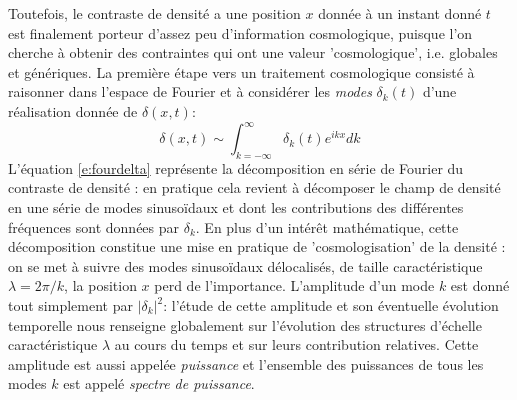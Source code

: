 Toutefois, le contraste de densité a une position $x$ donnée à un instant donné $t$ est finalement porteur d'assez peu d'information cosmologique, puisque l'on cherche à obtenir des contraintes qui ont une valeur 'cosmologique', i.e. globales et génériques. La première étape vers un traitement cosmologique consisté à raisonner dans l'espace de Fourier et à considérer les \textit{modes} $\delta_k(t)$ d'une réalisation donnée de $\delta(x,t)$:
\begin{equation}
\delta(x,t)\sim\int_{k=-\infty}^\infty \delta_k(t) e^{ikx} dk
\label{e:fourdelta}
\end{equation}
L'équation \ref{e:fourdelta} représente la décomposition en série de Fourier du contraste de densité : en pratique cela revient à décomposer le champ de densité en une série de modes sinusoïdaux et dont les contributions des différentes fréquences sont données par $\delta_k$. En plus d'un intérêt mathématique, cette décomposition constitue une mise en pratique de 'cosmologisation' de la densité : on se met à suivre des modes sinusoïdaux délocalisés, de taille caractéristique $\lambda=2\pi/k$, la position $x$ perd de l'importance. L'amplitude d'un mode $k$ est donné tout simplement par $|\delta_k|^2$: l'étude de cette amplitude et son éventuelle évolution temporelle nous renseigne globalement sur l'évolution des structures d'échelle caractéristique $\lambda$ au cours du temps et sur leurs contribution relatives. Cette amplitude est aussi appelée \textit{puissance} et l'ensemble des puissances de tous les modes $k$ est appelé \textit{spectre de puissance}.

